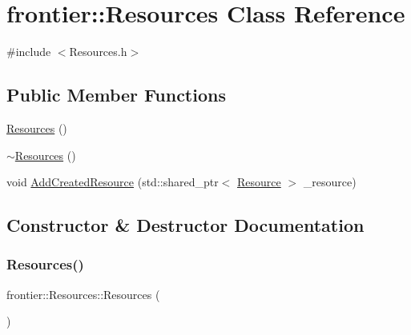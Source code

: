 \hypertarget{classfrontier_1_1_resources}{}\section{frontier\+:\+:Resources Class Reference}
\label{classfrontier_1_1_resources}


{\ttfamily \#include $<$Resources.\+h$>$}

\subsection*{Public Member Functions}
\begin{DoxyCompactItemize}
\item 
\hyperlink{classfrontier_1_1_resources_abd97410717435c463dccdb6e2d45043c}{Resources} ()
\item 
\hyperlink{classfrontier_1_1_resources_aa286a888a19e4ea5b5a94aa7ac1898b8}{$\sim$\+Resources} ()
\item 
void \hyperlink{classfrontier_1_1_resources_a34e0df1d6b935644bccee94ebe600a4a}{Add\+Created\+Resource} (std\+::shared\+\_\+ptr$<$ \hyperlink{classfrontier_1_1_resource}{Resource} $>$ \+\_\+resource)
\end{DoxyCompactItemize}


\subsection{Constructor \& Destructor Documentation}
\mbox{\label{classfrontier_1_1_resources_abd97410717435c463dccdb6e2d45043c}} 
\subsubsection{\texorpdfstring{Resources()}{Resources()}}
{\footnotesize\ttfamily frontier\+::\+Resources\+::\+Resources (\begin{DoxyParamCaption}{ }\end{DoxyParamCaption})}

\mbox{\label{classfrontier_1_1_resources_aa286a888a19e4ea5b5a94aa7ac1898b8}} 
